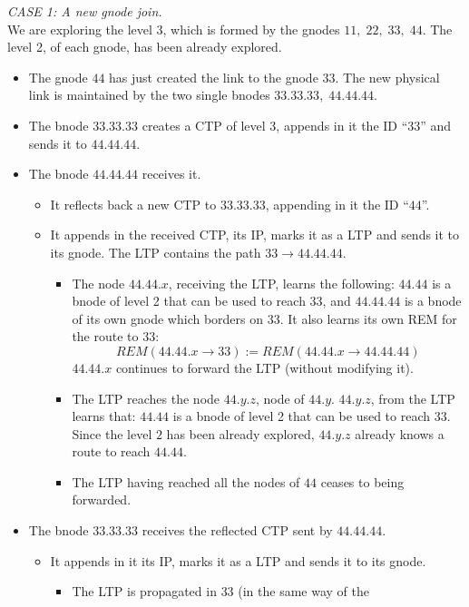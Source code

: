 \documentclass[a4paper]{article}
\begin{document}
\newline
\emph{CASE 1:  A new gnode join.}\\
We are exploring the level 3, which is formed by the gnodes 
$11,\;22,\;33,\;44$. The level 2, of each gnode, has been already
explored.
\begin{itemize}
	\item 
The gnode $44$ has just created the link to the gnode $33$. The
new physical link is maintained by the two single bnodes
$33.33.33,\;44.44.44$.
\item The bnode $33.33.33$ creates a CTP of level 3, appends in it the ID ``$33$''
and sends it to $44.44.44$.
\item The bnode $44.44.44$ receives it.
	\begin{itemize}
		\item It reflects back a new CTP to $33.33.33$, appending in it
			the ID ``$44$''.
		\item It appends in the received CTP, its IP, marks it as a
			LTP and sends it to its gnode. The LTP contains the
			path $33\rightarrow 44.44.44$.
			\begin{itemize}
				\item The node $44.44.x$, receiving the LTP,
					learns the following: $44.44$ is a bnode of
					level 2 that can be used to reach
					$33$, and $44.44.44$ is a bnode of its
					own gnode which borders on $33$. It
					also learns its own REM for the
					route to $33$: \[REM(44.44.x
					\rightarrow
					33):=REM(44.44.x\rightarrow 44.44.44)\]
					$44.44.x$ continues to forward the LTP
					(without modifying it).
				\item The LTP reaches the node $44.y.z$,
					node of $44.y$. $44.y.z$, from the LTP
					learns that: $44.44$ is a bnode of
                                        level 2 that can be used to reach
					$33$. Since the level $2$ has been
					already explored, $44.y.z$ already
					knows a route to reach $44.44$.
				\item The LTP having reached all the nodes of
					$44$ ceases to being forwarded.
			\end{itemize}
	\end{itemize}
\item The bnode $33.33.33$ receives the reflected CTP sent by $44.44.44$.
	\begin{itemize}
		\item It appends in it its IP, marks it as a LTP and sends it to its gnode.
			\begin{itemize}
				\item The LTP is propagated in $33$ (in the same way of the

\end{itemize}
\end{itemize}
\end{itemize}
\end{document}

